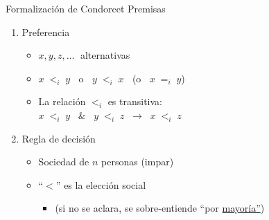 \documentclass[bigger]{beamer}
\begin{document}
\begin{frame}[label={sec:org3f60498}]{Formalización de Condorcet}
Premisas
\begin{enumerate}
\item \alert{Preferencia} 
\begin{itemize}
\item \(x,y,z,\ldots\;\) alternativas
\item \(x\;<_i\;y\;\;\) o \(\;\;y\;<_i\;x\;\;\) (o \(\;\;x\;=_i\;y\))
\item La relación \(<_i\) es transitiva: \\[0pt]
\(x\;<_i\;y  \;\;\;\&\;\;\; y\;<_i\;z \;\; \rightarrow \;\; x\;<_i\;z\)
\end{itemize}
\item \alert{Regla de decisión}
\begin{itemize}
\item Sociedad de \(n\) personas (impar)
\item ``\(<\)'' es la elección social
\begin{itemize}
\item (si no se aclara, se sobre-entiende ``por \uline{mayoría''})
\end{itemize}
\end{itemize}
\end{enumerate}
\end{frame}
\end{document}
